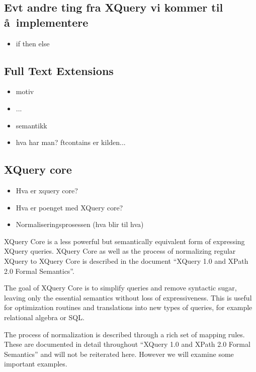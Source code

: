 \subsection{Evt andre ting fra XQuery vi kommer til \aa~implementere}

\begin{itemize}
\item if then else

\end{itemize}

\subsection{Full Text Extensions}

\begin{itemize}
\item motiv
\item ...
\item semantikk
\item hva har man? ftcontains er kilden...
\end{itemize}

\subsection{XQuery core}
\begin{itemize}
  \item Hva er xquery core?
  \item Hva er poenget med XQuery core?
  \item Normaliseringsprosessen (hva blir til hva)
\end{itemize}

XQuery Core is a less powerful but semantically equivalent form of expressing
XQuery queries. XQuery Core as well as the process of normalizing regular
XQuery to XQuery Core is described in the document ``XQuery 1.0 and XPath 2.0
Formal Semantics''\cite{xquery_semantics}.

The goal of XQuery Core is to simplify queries and remove syntactic sugar,
leaving only the essential semantics without loss of expressiveness.
This is useful for optimization routines and translations into new types of
queries, for example relational algebra or SQL.

The process of normalization is described through a rich set of mapping
rules. These are documented in detail throughout ``XQuery 1.0 and XPath 2.0
Formal Semantics''\cite{xquery_semantics} and will not be reiterated here.
However we will examine some important examples.


